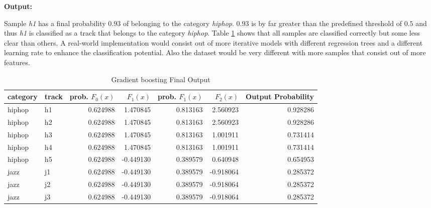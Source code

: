 \textbf{Output:}

Sample \emph{h1} has a final probability \(0.93\) of belonging to the category \emph{hiphop}. \(0.93\) is by far greater than the 
predefined threshold of \(0.5\) and thus \emph{h1} is classified as a track that belongs to the category \emph{hiphop}. Table \ref{tbl:theory_gb_final_output} shows
that all samples are classified correctly but some less clear than others. A real-world implementation would consist 
out of more iterative models with different regression trees and a different learning rate to enhance the 
classification potential. Also the dataset would be very different with more samples that consist out of more features. 

\begin{table}[H]
    \centering
    \begin{tabular}{llrrrrr}
        \toprule
        category & track &  prob. \(F_{0}(x)\) &    \(F_{1}(x)\) &  prob. \(F_{1}(x)\) &       \(F_{2}(x)\) &  Output Probability \\
        \midrule
          hiphop &    h1 &         0.624988 &  1.470845 &         0.813163 &  2.560923 &                          0.928286 \\
          hiphop &    h2 &         0.624988 &  1.470845 &         0.813163 &  2.560923 &                          0.928286 \\
          hiphop &    h3 &         0.624988 &  1.470845 &         0.813163 &  1.001911 &                          0.731414 \\
          hiphop &    h4 &         0.624988 &  1.470845 &         0.813163 &  1.001911 &                          0.731414 \\
          hiphop &    h5 &         0.624988 & -0.449130 &         0.389579 &  0.640948 &                          0.654953 \\
            jazz &    j1 &         0.624988 & -0.449130 &         0.389579 & -0.918064 &                          0.285372 \\
            jazz &    j2 &         0.624988 & -0.449130 &         0.389579 & -0.918064 &                          0.285372 \\
            jazz &    j3 &         0.624988 & -0.449130 &         0.389579 & -0.918064 &                          0.285372 \\
        \bottomrule
        \end{tabular}           
    \caption{Gradient boosting Final Output}%
    \label{tbl:theory_gb_final_output}%
  \end{table} 

